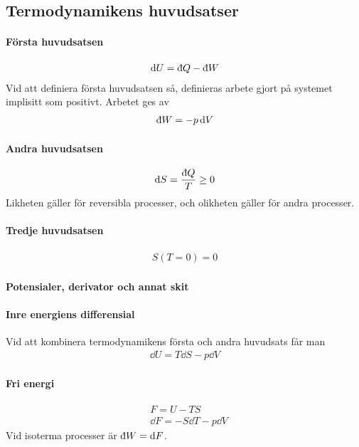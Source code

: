 \subsection{Termodynamikens huvudsatser}

\paragraph{Första huvudsatsen}
\begin{align*}
	\dd{U} = \idd Q - \idd W
\end{align*}
Vid att definiera första huvudsatsen så, definieras arbete gjort på systemet implisitt som positivt. Arbetet ges av
\begin{align*}
	\idd W = -p\dd{V}
\end{align*}

\paragraph{Andra huvudsatsen}
\begin{align*}
	\dd{S} = \frac{\idd Q}{T} \geq 0
\end{align*}
Likheten gäller för reversibla processer, och olikheten gäller för andra processer.

\paragraph{Tredje huvudsatsen}
\begin{align*}
	S(T = 0) = 0
\end{align*}

\paragraph{Potensialer, derivator och annat skit}

\paragraph{Inre energiens differensial}
Vid att kombinera termodynamikens första och andra huvudsats får man
\begin{align*}
	\dd{U} = T\dd{S} - p\dd{V}
\end{align*}

\paragraph{Fri energi}
\begin{align*}
	& F = U -TS\\
	& \dd{F} = -S\dd{T} - p\dd{V}
\end{align*}
Vid isoterma processer är $\idd W = \dd{F}$.

